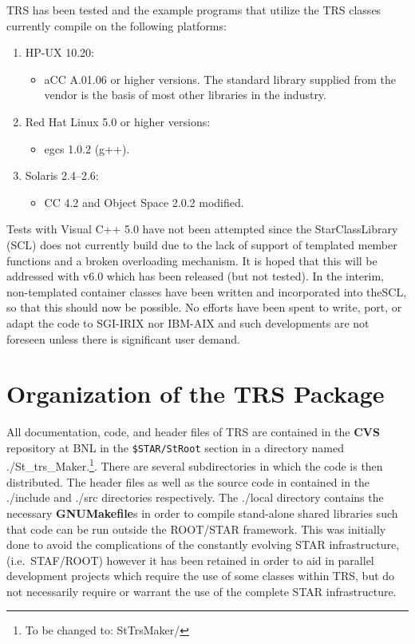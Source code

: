 \documentclass[twoside]{article}
\newcommand{\name}[1]{\textsf{#1}}%
\newcommand{\comp}[1]{\texttt{#1}}%
\begin{document}
\name{TRS} has been tested and the example programs that 
utilize the \name{TRS} classes currently compile on the following 
platforms:
\begin{enumerate}
\item HP-UX 10.20: 
  \begin{itemize}
    \item aCC A.01.06 or higher versions. The standard library
      supplied from the vendor is the basis of most other libraries
      in the industry. 
  \end{itemize}
\item Red Hat Linux 5.0 or higher versions: 
  \begin{itemize}
    \item egcs 1.0.2 (g++).
  \end{itemize}
\item Solaris 2.4--2.6: 
  \begin{itemize}
    \item CC 4.2 and Object Space 2.0.2 modified. 
  \end{itemize}
\end{enumerate}
Tests with Visual C++ 5.0 have not been attempted since the
StarClassLibrary (SCL)  does
not currently build due to the lack of support of 
templated member functions and a broken overloading mechanism.  It
is hoped that this will be addressed with v6.0 which has been released
(but not tested).  In the interim, non-templated container classes
have been written and incorporated into the\name{SCL}, so that this
should now be possible.
No efforts have been spent to write, port, or adapt the code
to SGI-IRIX  
nor IBM-AIX and such developments are not foreseen  unless there is
significant user demand.  

\section{Organization of the \name{TRS} Package}

All documentation, code, and header files of \name{TRS} are contained in
the {\bf CVS} repository at BNL in the \comp{\$STAR/StRoot} section
in a
directory named \name{./St_trs_Maker}.\footnote{To be changed to: 
        \name{StTrsMaker/}}.  
There are several subdirectories
in  which  the code is then distributed.  The header files as well
as the source code in contained in the \name{./include} and \name{./src}
directories respectively.  The \name{./local} directory contains the
necessary {\bf GNUMakefile}s in order to compile stand-alone shared
libraries such that code can be run outside the ROOT/STAR framework.
This was initially done to avoid the complications of the constantly
evolving STAR infrastructure, (i.e.~STAF/ROOT)  
however it has been retained in order to aid in parallel development
projects which require the use of some classes within \name{TRS}, but do
not necessarily require or warrant the use of the complete STAR 
infrastructure.  
\end{document}
